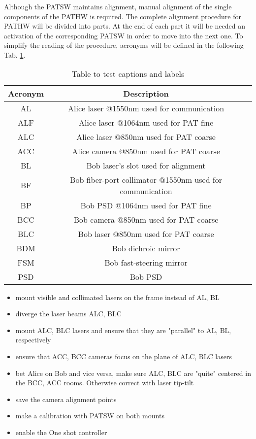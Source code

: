 Although the PATSW maintains alignment, manual alignment of the single components of the PATHW is required.
The complete alignment procedure for PATHW will be divided into parts. At the end of each part it will be needed an activation of the corresponding PATSW in order to move into the next one. To simplify the reading of the procedure, acronyms will be defined in the following Tab. \ref{table:1}.
\begin{table}[h!]
  \centering
  \begin{tabular}{ |c|c|c| }
    \hline
    Acronym & Description                                              \\
    \hline
    AL      & Alice laser @1550nm used for communication               \\
    ALF     & Alice laser @1064nm used for PAT fine                    \\
    ALC     & Alice laser @850nm used for PAT coarse                   \\
    ACC     & Alice camera @850nm used for PAT coarse                  \\
    \hline
    BL      & Bob laser's slot used for alignment                      \\
    BF      & Bob fiber-port collimator @1550nm used for communication \\
    BP      & Bob PSD @1064nm used for PAT fine                        \\
    BCC     & Bob camera @850nm used for PAT coarse                    \\
    BLC     & Bob laser @850nm used for PAT coarse                     \\
    BDM     & Bob dichroic mirror                                      \\
    FSM     & Bob fast-steering mirror                                 \\
    PSD     & Bob PSD                                                  \\
    \hline
  \end{tabular}
  \caption{Table to test captions and labels}
  \label{table:1}
\end{table}

\begin{itemize}
  \item mount visible and collimated lasers on the frame instead of AL, BL
  \item diverge the laser beams ALC, BLC
  \item mount ALC, BLC lasers and ensure that they are "parallel" to AL, BL, respectively
  \item ensure that ACC, BCC cameras focus on the plane of ALC, BLC lasers
  \item bet Alice on Bob and vice versa, make sure ALC, BLC are "quite" centered in the BCC, ACC rooms. Otherwise correct with laser tip-tilt
  \item save the camera alignment points
  \item make a calibration with PATSW on both mounts
  \item enable the One shot controller
\end{itemize}


